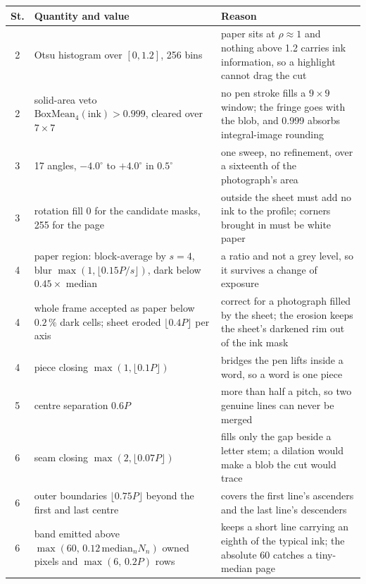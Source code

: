 \begin{table}[!htbp]
\centering
\fontsize{8}{9.4}\selectfont
\setlength{\tabcolsep}{3.5pt}
\renewcommand{\arraystretch}{1.05}
\begin{tabularx}{\linewidth}{|c|p{5.1cm}|X|}
\hline
\textbf{St.} & \textbf{Quantity and value} & \textbf{Reason} \\
\hline
2 & Otsu histogram over $[0,1.2]$, 256 bins & paper sits at $\rho\approx1$ and nothing above 1.2 carries ink information, so a highlight cannot drag the cut \\
\hline
2 & solid-area veto $\mathrm{BoxMean}_4(\mathrm{ink})>0.999$, cleared over $7\times7$ & no pen stroke fills a $9\times9$ window; the fringe goes with the blob, and 0.999 absorbs integral-image rounding \\
\hline
3 & 17 angles, $-4.0^\circ$ to $+4.0^\circ$ in $0.5^\circ$ & one sweep, no refinement, over a sixteenth of the photograph's area \\
\hline
3 & rotation fill 0 for the candidate masks, 255 for the page & outside the sheet must add no ink to the profile; corners brought in must be white paper \\
\hline
4 & paper region: block-average by $s=4$, blur $\max(1,\lfloor0.15P/s\rfloor)$, dark below $0.45\times$ median & a ratio and not a grey level, so it survives a change of exposure \\
\hline
4 & whole frame accepted as paper below $0.2\,\%$ dark cells; sheet eroded $\lfloor0.4P\rfloor$ per axis & correct for a photograph filled by the sheet; the erosion keeps the sheet's darkened rim out of the ink mask \\
\hline
4 & piece closing $\max(1,\lfloor0.1P\rfloor)$ & bridges the pen lifts inside a word, so a word is one piece \\
\hline
5 & centre separation $0.6P$ & more than half a pitch, so two genuine lines can never be merged \\
\hline
6 & seam closing $\max(2,\lfloor0.07P\rfloor)$ & fills only the gap beside a letter stem; a dilation would make a blob the cut would trace \\
\hline
6 & outer boundaries $\lfloor0.75P\rfloor$ beyond the first and last centre & covers the first line's ascenders and the last line's descenders \\
\hline
6 & band emitted above $\max(60,\,0.12\,\mathrm{median}_n N_n)$ owned pixels and $\max(6,\,0.2P)$ rows & keeps a short line carrying an eighth of the typical ink; the absolute 60 catches a tiny-median page \\

\end{tabularx}
\end{table}
